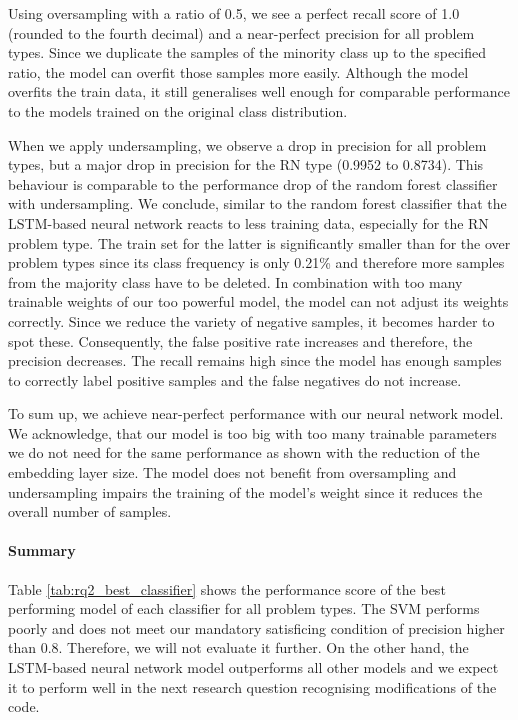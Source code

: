 Using oversampling with a ratio of 0.5, we see a perfect recall score of 1.0 (rounded to the fourth decimal) and a near-perfect precision for all problem types. Since we duplicate the samples of the minority class up to the specified ratio, the model can overfit those samples more easily. Although the model overfits the train data, it still generalises well enough for comparable performance to the models trained on the original class distribution.

When we apply undersampling, we observe a drop in precision for all problem types, but a major drop in precision for the RN type (0.9952 to 0.8734). This behaviour is comparable to the performance drop of the random forest classifier with undersampling. We conclude, similar to the random forest classifier that the LSTM-based neural network reacts to less training data, especially for the RN problem type. The train set for the latter is significantly smaller than for the over problem types since its class frequency is only 0.21\% and therefore more samples from the majority class have to be deleted. In combination with too many trainable weights of our too powerful model, the model can not adjust its weights correctly. Since we reduce the variety of negative samples, it becomes harder to spot these. Consequently, the false positive rate increases and therefore, the precision decreases. The recall remains high since the model has enough samples to correctly label positive samples and the false negatives do not increase.

To sum up, we achieve near-perfect performance with our neural network model. We acknowledge, that our model is too big with too many trainable parameters we do not need for the same performance as shown with the reduction of the embedding layer size. The model does not benefit from oversampling and undersampling impairs the training of the model's weight since it reduces the overall number of samples.

\paragraph{Summary}

 Table \ref{tab:rq2_best_classifier} shows the performance score of the best performing model of each classifier for all problem types.
 The SVM performs poorly and does not meet our mandatory satisficing condition of precision higher than 0.8. Therefore, we will not evaluate it further. On the other hand, the LSTM-based neural network model outperforms all other models and we expect it to perform well in the next research question recognising modifications of the code.

